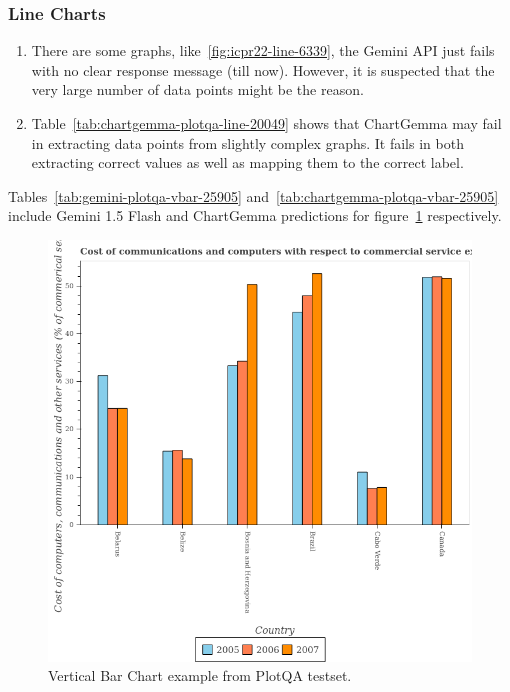 \documentclass[
	letterpaper, %
]{jdf}
\begin{document}
              \subsubsection{Line Charts}\label{sssect:line-errors}
              \begin{enumerate}
         \item There are some graphs, like~\ref{fig:icpr22-line-6339}, the Gemini API just fails with no clear response message (till now).
             However, it is suspected that the very large number of data points might be the reason.
         \item Table~\ref{tab:chartgemma-plotqa-line-20049} shows that ChartGemma may fail in extracting data points from slightly complex graphs.
             It fails in both extracting correct values as well as mapping them to the correct label.
                            \end{enumerate}
              Tables~\ref{tab:gemini-plotqa-vbar-25905} and~\ref{tab:chartgemma-plotqa-vbar-25905} include Gemini 1.5 Flash and ChartGemma predictions for figure~\ref{fig:plotqa-vbar-25905} respectively.
\begin{figure}
     \includegraphics{test-sample/plotqa/images/vertical-bar/25905.png}
     \caption{Vertical Bar Chart example from PlotQA testset.}\label{fig:plotqa-vbar-25905}
      \end{figure}


\end{document}
